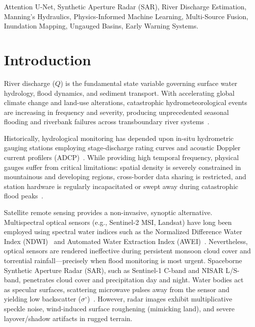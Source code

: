 \documentclass[conference]{IEEEtran}
\begin{document}
\begin{IEEEkeywords}
Attention U-Net, Synthetic Aperture Radar (SAR), River Discharge Estimation, Manning's Hydraulics, Physics-Informed Machine Learning, Multi-Source Fusion, Inundation Mapping, Ungauged Basins, Early Warning Systems.
\end{IEEEkeywords}

\section{Introduction}
River discharge ($Q$) is the fundamental state variable governing surface water hydrology, flood dynamics, and sediment transport. With accelerating global climate change and land-use alterations, catastrophic hydrometeorological events are increasing in frequency and severity, producing unprecedented seasonal flooding and riverbank failures across transboundary river systems~\cite{bates2022}.

Historically, hydrological monitoring has depended upon in-situ hydrometric gauging stations employing stage-discharge rating curves and acoustic Doppler current profilers (ADCP)~\cite{hirsch2018}. While providing high temporal frequency, physical gauges suffer from critical limitations: spatial density is severely constrained in mountainous and developing regions, cross-border data sharing is restricted, and station hardware is regularly incapacitated or swept away during catastrophic flood peaks~\cite{matgen2020}. 

Satellite remote sensing provides a non-invasive, synoptic alternative. Multispectral optical sensors (e.g., Sentinel-2 MSI, Landsat) have long been employed using spectral water indices such as the Normalized Difference Water Index (NDWI)~\cite{mcfeeters1996} and Automated Water Extraction Index (AWEI)~\cite{feyisa2014}. Nevertheless, optical sensors are rendered ineffective during persistent monsoon cloud cover and torrential rainfall—precisely when flood monitoring is most urgent. Spaceborne Synthetic Aperture Radar (SAR), such as Sentinel-1 C-band and NISAR L/S-band, penetrates cloud cover and precipitation day and night. Water bodies act as specular surfaces, scattering microwave pulses away from the sensor and yielding low backscatter ($\sigma^\circ$)~\cite{clement2018}. However, radar images exhibit multiplicative speckle noise, wind-induced surface roughening (mimicking land), and severe layover/shadow artifacts in rugged terrain.
\end{document}
